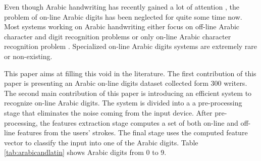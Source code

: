 \documentclass[10pt]{IEEEtran}
\begin{document}
Even though Arabic handwriting has recently gained a lot of attention \cite{ICDAR2009,Hamdani2009,ARKherallah2009}, the problem of on-line Arabic digits has been neglected for quite some time now. Most systems working on Arabic handwriting either focus on off-line Arabic character and digit recognition problems or only on-line Arabic character recognition problem \cite{ARAlamri2008,ARMargner2006,Mezghani2002,Mezghani3332005}. Specialized on-line Arabic digits systems are extremely rare or non-existing.

This paper aims at filling this void in the literature. The first contribution of this paper is presenting an Arabic on-line digits dataset collected form 300 writers. The second main contribution of this paper is introducing an efficient system to recognize on-line Arabic digits. The system is divided into a a pre-processing stage that eliminates the noise coming from the input device. After pre-processing, the features extraction stage computes a set of both on-line and off-line features from the users' strokes. The final stage uses the computed feature vector to classify the input into one of the Arabic digits. Table \ref{tab:arabicandlatin} shows Arabic digits from 0 to 9.

\begin{table}[h]
\begin{center}
\caption{Arabic Printed and Handwritten Digits.}
	\label{tab:arabicandlatin}
	 \end{center}  \end{table}
\end{document}
